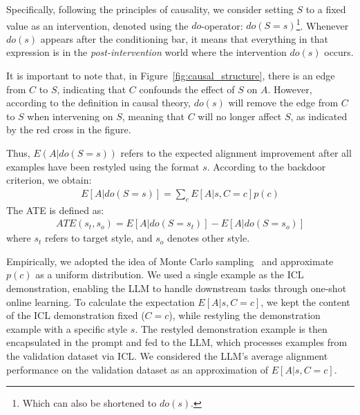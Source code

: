 Specifically, following the principles of causality, we consider setting $S$ to a fixed value as an intervention, denoted using the $do$-operator: $do(S=s)$\footnote{Which can also be shortened to $do(s)$.}.
Whenever $do(s)$ appears after the conditioning bar, it means that everything in that expression is in the \textit{post-intervention} world where the intervention $do(s)$ occurs.

It is important to note that, in Figure~\ref{fig:causal_structure}, there is an edge from $C$ to $S$, indicating that $C$ confounds the effect of $S$ on $A$. 
However, according to the definition in causal theory, $do(s)$ will remove the edge from $C$ to $S$ when intervening on $S$, meaning that $C$ will no longer affect $S$, as indicated by the red cross in the figure.

Thus, $E(A|do(S=s))$ refers to the expected alignment improvement after all examples have been restyled using the format $s$. According to the backdoor criterion, we obtain:
\begin{align}
E[A | do(S = s)] = \sum_{c} E[A | s, C = c] p(c)
\end{align}
The ATE is defined as:
\begin{align}
ATE(s_t, s_o) = E[A | do(S = s_t)] - E[A | do(S = s_o)]
\label{equ:ATE}
\end{align}
where $s_t$ refers to target style, and $s_o$ denotes other style.

Empirically, we adopted the idea of Monte Carlo sampling~\citep{knaus2021machine} and approximate $p(c)$ as a uniform distribution.
We used a single example as the ICL demonstration, enabling the LLM to handle downstream tasks through one-shot online learning. 
To calculate the expectation $E[A | s, C = c]$, we kept the content of the ICL demonstration fixed ($C=c$), while restyling the demonstration example with a specific style $s$.
The restyled demonstration example is then encapsulated in the prompt and fed to the LLM, which processes examples from the validation dataset via ICL. 
We considered the LLM’s average alignment performance on the validation dataset as an approximation of $E[A | s, C = c]$. %


